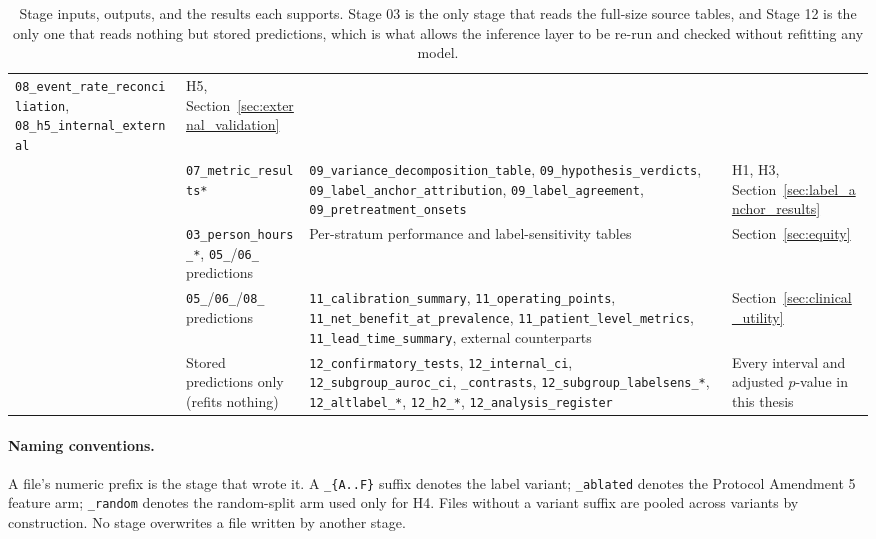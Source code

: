 \begin{table}[H]
\begin{tabularx}{\textwidth}{p{0.9cm}p{3.5cm}Xp{2.7cm}}
        \texttt{08\_event\_rate\_reconciliation},
        \texttt{08\_h5\_internal\_external} &
        H5,
        Section~\ref{sec:external_validation} \\
        \addlinespace
        09 & \texttt{07\_metric\_results*} &
        \texttt{09\_variance\_decomposition\_table},
        \texttt{09\_hypothesis\_verdicts},
        \texttt{09\_label\_anchor\_attribution},
        \texttt{09\_label\_agreement}, \texttt{09\_pretreatment\_onsets} &
        H1, H3,
        Section~\ref{sec:label_anchor_results} \\
        \addlinespace
        10 & \texttt{03\_person\_hours\_*}, \texttt{05\_}/\texttt{06\_}
        predictions &
        Per-stratum performance and label-sensitivity tables &
        Section~\ref{sec:equity} \\
        \addlinespace
        11 & \texttt{05\_}/\texttt{06\_}/\texttt{08\_} predictions &
        \texttt{11\_calibration\_summary}, \texttt{11\_operating\_points},
        \texttt{11\_net\_benefit\_at\_prevalence},
        \texttt{11\_patient\_level\_metrics},
        \texttt{11\_lead\_time\_summary}, external counterparts &
        Section~\ref{sec:clinical_utility} \\
        \addlinespace
        12 & Stored predictions only (refits nothing) &
        \texttt{12\_confirmatory\_tests}, \texttt{12\_internal\_ci},
        \texttt{12\_subgroup\_auroc\_ci}, \texttt{\_contrasts},
        \texttt{12\_subgroup\_labelsens\_*}, \texttt{12\_altlabel\_*},
        \texttt{12\_h2\_*}, \texttt{12\_analysis\_register} &
        Every interval and adjusted $p$-value in this thesis \\
        \bottomrule
    \end{tabularx}
    \caption{Stage inputs, outputs, and the results each supports. Stage 03 is
    the only stage that reads the full-size source tables, and Stage 12 is the
    only one that reads nothing but stored predictions, which is what allows
    the inference layer to be re-run and checked without refitting any model.}
    \label{tab:stage_reference}
\end{table}

\paragraph{Naming conventions.} A file's numeric prefix is the stage that wrote
it. A \texttt{\_\{A..F\}} suffix denotes the label variant; \texttt{\_ablated}
denotes the Protocol Amendment 5 feature arm; \texttt{\_random} denotes the
random-split arm used only for H4. Files without a variant suffix are pooled
across variants by construction. No stage overwrites a file written by another
stage.
